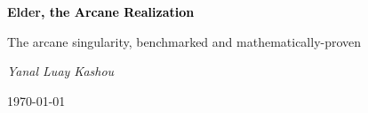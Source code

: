\documentclass[11pt,twoside,openright]{book}
\begin{document}
\frontmatter

\begin{titlepage}
    \centering
    \vspace*{2cm}
    {\Huge\bfseries \textcolor{DarkSkyBlue}{Elder}\textrm{\textcolor{black}{, the Arcane Realization}}\par}
    \vspace{2cm}
    {\Large The arcane singularity, benchmarked and mathematically-proven\par}
    \vspace{4cm}
    {\Large\itshape Yanal Luay Kashou\par}
    \vfill
    {\large \today\par}
\end{titlepage}

\tableofcontents
\listoffigures
\listoftables
\listofalgorithms
\listoftheorems

\mainmatter



\backmatter

\printbibliography[title=References]

\printindex
\end{document}
